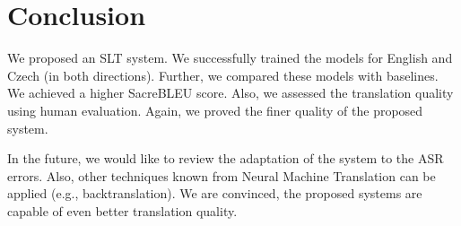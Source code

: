 \section{Conclusion}
\label{slt:conclusion}
We proposed an SLT system. We successfully trained the models for English and Czech (in both directions). Further, we compared these models with baselines. We achieved a higher SacreBLEU score. Also, we assessed the translation quality using human evaluation. Again, we proved the finer quality of the proposed system.

In the future, we would like to review the adaptation of the system to the ASR errors. Also, other techniques known from Neural Machine Translation can be applied (e.g., backtranslation). We are convinced, the proposed systems are capable of even better translation quality. 